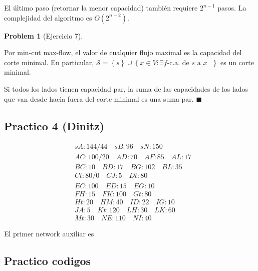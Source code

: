 \documentclass[a4paper]{article}
\newtheorem{problem}{Problem}
\newtheorem{problem}{Problem}
\begin{document}
El último paso (retornar la menor capacidad) también requiere $2^{n-1}$ pasos.
La complejidad del algoritmo es $O(2^{n-2})$.

\begin{problem}[Ejercicio 7]
    
\end{problem}

Por min-cut max-flow, el valor de cualquier flujo maximal es la capacidad del
corte minimal. En particular, $\mathcal{S} = \left\{ s \right\} \cup  \left\{ x
\in V : \exists f\text{-c.a.} \text{ de $s$ a $x$ }\right\} $ es un corte
minimal.

Si todos los lados tienen capacidad par, la suma de las
capacidades de los lados que van desde hacia fuera del corte minimal es una suma
par. $\blacksquare$

\pagebreak 

\subsection{Practico 4 (Dinitz)}

\begin{align*}
&sA: 144/44 \quad sB: 96 \quad sN: 150 \\ 
&AC: 100 / 20 \quad AD: 70 \quad AF: 85 \quad AL: 17\\
&BC: 10 \quad BD :17 \quad BG :102 \quad BL: 35 \\
&Ct: 80/0 \quad CJ :5 \quad Dt: 80\\
&EC: 100 \quad ED: 15 \quad EG: 10\\
&FH: 15 \quad FK :100 \quad Gt: 80\\
&Ht: 20 \quad HM :40 \quad ID :22 \quad IG :10 \\
&JA: 5 \quad Kt :120 \quad LH :30 \quad LK :60 \\ 
&Mt: 30 \quad NE: 110 \quad NI: 40
\end{align*}


El primer network auxiliar es 
\pagebreak
\subsection{Practico codigos}
\end{document}
